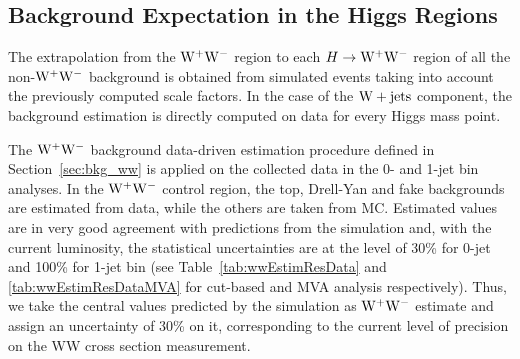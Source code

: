 \subsection{Background Expectation in the Higgs Regions}
The extrapolation from the $\mathrm{W}^+\mathrm{W}^-$ region 
to each $H \to \mathrm{W}^+\mathrm{W}^-$ region of all the non-$\mathrm{W}^+\mathrm{W}^-$ background is obtained from simulated 
events taking into account the previously computed scale factors. In the case of the 
$\mathrm{W+jets}$ component, the background estimation is directly computed on data for every 
Higgs mass point.

The $\mathrm{W}^+\mathrm{W}^-$ background data-driven estimation procedure defined in Section~\ref{sec:bkg_ww} is applied on the 
collected data in the 0- and 1-jet bin analyses.
In the $\mathrm{W}^+\mathrm{W}^-$ control region, the top, Drell-Yan and fake backgrounds are estimated from data, while the others are taken from MC. 
Estimated values are in very good agreement with predictions from the simulation and, with the current luminosity, 
the statistical uncertainties are at the level of 30\% for 0-jet and 100\% for 1-jet bin 
(see Table~\ref{tab:wwEstimResData} and \ref{tab:wwEstimResDataMVA} for cut-based and MVA analysis respectively).
Thus, we take the central values predicted by the simulation as $\mathrm{W}^+\mathrm{W}^-$ estimate and assign an uncertainty of 30\% on it, corresponding to the current level of 
precision on the WW cross section measurement.

